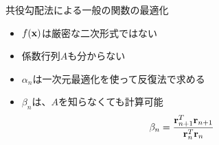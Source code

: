 \begin{frame}[t,fragile]{共役勾配法による一般の関数の最適化}
  \begin{itemize}
    \setlength{\itemsep}{1em}
  \item $f({\bf x})$は厳密な二次形式ではない
  \item 係数行列$A$も分からない
  \item $\alpha_n$は一次元最適化を使って反復法で求める
  \item $\beta_n$は、$A$を知らなくても計算可能
    \begin{align*}
      \beta_n &= \frac{{\bf r}_{n+1}^T {\bf r}_{n+1}}{{\bf r}_n^T {\bf r}_n}
    \end{align*}
  \end{itemize}
\end{frame}
